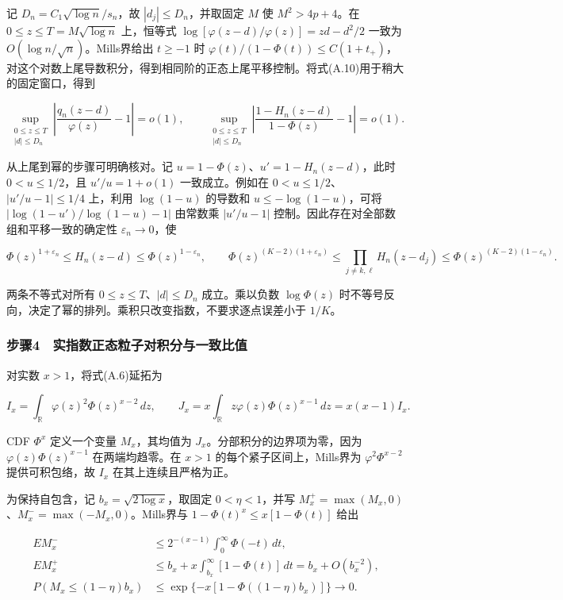 \documentclass[11pt,a4paper]{article}
\begin{document}
记 \(D_n=C_1\sqrt{\log n}/s_n\)，故 \(|d_j|\le D_n\)，并取固定 \(M\) 使
\(M^2>4p+4\)。在 \(0\le z\le T=M\sqrt{\log n}\) 上，恒等式
\(\log[\varphi(z-d)/\varphi(z)]=zd-d^2/2\) 一致为
\(O(\log n/\sqrt n)\)。Mills界给出 \(t\ge-1\) 时
\(\varphi(t)/(1-\Phi(t))\le C(1+t_+)\)，对这个对数上尾导数积分，得到相同阶的正态上尾平移控制。将式(A.10)用于稍大的固定窗口，得到

\[
\sup_{\substack{0\le z\le T\\ |d|\le D_n}}
\left|\frac{q_n(z-d)}{\varphi(z)}-1\right|=o(1),\qquad
\sup_{\substack{0\le z\le T\\ |d|\le D_n}}
\left|\frac{1-H_n(z-d)}{1-\Phi(z)}-1\right|=o(1).
\]

从上尾到幂的步骤可明确核对。记 \(u=1-\Phi(z)\)、\(u'=1-H_n(z-d)\)，此时
\(0<u\le1/2\)，且 \(u'/u=1+o(1)\) 一致成立。例如在
\(0<u\le1/2\)、\(|u'/u-1|\le1/4\) 上，利用 \(\log(1-u)\) 的导数和
\(u\le-\log(1-u)\)，可将 \(|\log(1-u')/\log(1-u)-1|\) 由常数乘
\(|u'/u-1|\) 控制。因此存在对全部数组和平移一致的确定性
\(\varepsilon_n\to0\)，使

\[
\Phi(z)^{1+\varepsilon_n}\le H_n(z-d)\le\Phi(z)^{1-\varepsilon_n},\qquad
\Phi(z)^{(K-2)(1+\varepsilon_n)}
\le\prod_{j\ne k,\ell}H_n(z-d_j)
\le\Phi(z)^{(K-2)(1-\varepsilon_n)}.
\]

两条不等式对所有 \(0\le z\le T\)、\(|d|\le D_n\) 成立。乘以负数
\(\log\Phi(z)\)
时不等号反向，决定了幂的排列。乘积只改变指数，不要求逐点误差小于
\(1/K\)。

\subsubsection*{步骤4　实指数正态粒子对积分与一致比值}\label{ux6b65ux9aa44-ux5b9eux6307ux6570ux6b63ux6001ux7c92ux5b50ux5bf9ux79efux5206ux4e0eux4e00ux81f4ux6bd4ux503c}

对实数 \(x>1\)，将式(A.6)延拓为

\[
I_x=\int_{\mathbb R}\varphi(z)^2\Phi(z)^{x-2}\,dz,\qquad
J_x=x\int_{\mathbb R}z\varphi(z)\Phi(z)^{x-1}\,dz=x(x-1)I_x.
\]

CDF \(\Phi^x\) 定义一个变量 \(M_x\)，其均值为
\(J_x\)。分部积分的边界项为零，因为 \(\varphi(z)\Phi(z)^{x-1}\)
在两端均趋零。在 \(x>1\) 的每个紧子区间上，Mills界为
\(\varphi^2\Phi^{x-2}\) 提供可积包络，故 \(I_x\) 在其上连续且严格为正。

为保持自包含，记 \(b_x=\sqrt{2\log x}\)，取固定 \(0<\eta<1\)，并写
\(M_x^+=\max(M_x,0)\)、\(M_x^-=\max(-M_x,0)\)。Mills界与
\(1-\Phi(t)^x\le x[1-\Phi(t)]\) 给出

\[
\begin{aligned}
E M_x^-&\le 2^{-(x-1)}\int_0^\infty\Phi(-t)\,dt,\\
E M_x^+&\le b_x+x\int_{b_x}^\infty[1-\Phi(t)]\,dt=b_x+O(b_x^{-2}),\\
P(M_x\le(1-\eta)b_x)
&\le\exp\{-x[1-\Phi((1-\eta)b_x)]\}\longrightarrow0.
\end{aligned}
\]
\end{document}
